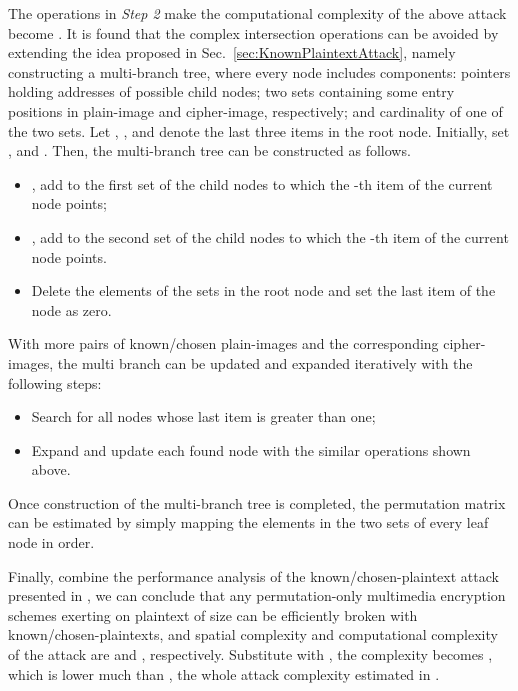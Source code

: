 \documentclass[3p,preprint,11pt]{elsarticle}
\begin{document}
The operations in \textit{Step 2} make the computational complexity
of the above attack become . It is found that the
complex intersection operations can be avoided by extending the idea
proposed in Sec.~\ref{sec:KnownPlaintextAttack}, namely constructing
a multi-branch tree, where every node includes  components:
 pointers holding addresses of  possible child nodes;
two sets containing some entry positions in plain-image and
cipher-image, respectively; and cardinality of one of the two sets. Let
, , and  denote the last
three items in the root node. Initially, set
, and
. Then, the multi-branch tree can be constructed as
follows.

\begin{itemize}
\item  , add  to the first set
of the child nodes to which the -th item of the current node
points;

\item  , add  to the second set
of the child nodes to which the -th item of the current node
points.

\item Delete the elements of the sets in the root node and set the
last item of the node as zero.
\end{itemize}

With more pairs of known/chosen plain-images and the corresponding
cipher-images, the multi branch can be updated and expanded
iteratively with the following steps:
\begin{itemize}
\item Search for all nodes whose last item is greater than one;

\item Expand and update each found node with the similar operations shown above.
\end{itemize}

Once construction of the multi-branch tree is completed, the
permutation matrix  can be estimated by simply mapping the elements
in the two sets of every leaf node in order.

Finally, combine the performance analysis of the known/chosen-plaintext attack presented in
\cite{Li:AttackingPOMC2008}, we can conclude that any permutation-only multimedia encryption
schemes exerting on plaintext of size  can be efficiently broken with 
known/chosen-plaintexts, and spatial complexity and computational
complexity of the attack are  and , respectively. Substitute  with ,
the complexity becomes , which is lower much than , the whole
attack complexity estimated in \cite{Li:AttackingPOMC2008}.
\end{document}
